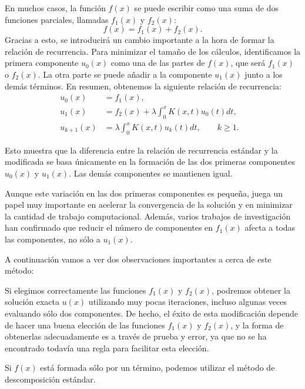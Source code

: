 En muchos casos, la función $f(x)$ se puede escribir como una suma de dos funciones parciales, llamadas $f_1(x)$ y $f_2(x)$:
\begin{equation}
	f(x) = f_1(x) + f_2(x).
\end{equation}
Gracias a esto, se introducirá un cambio importante a la hora de formar la relación de recurrencia. Para minimizar el tamaño de los cálculos, identificamos la primera componente $u_0(x)$ como una de las partes de $f(x)$, que será $f_1(x)$ o $f_2(x)$. La otra parte se puede añadir a la componente $u_1(x)$ junto a los demás términos. En resumen, obtenemos la siguiente relación de recurrencia:
\begin{align}
	u_0(x) &= f_1(x),      &   \\
	u_{1}(x) &= f_2(x) + \lambda \int_{0}^{x} K(x,t)u_0(t)dt,    &  \\
	u_{k+1}(x) &= \lambda \int_{0}^{x} K(x,t)u_k(t)dt, \qquad k \geqslant 1.    &
\end{align}	
\begin{observacion}
	Esto muestra que la diferencia entre la relación de recurrencia estándar y la modificada se basa únicamente en la formación de las dos primeras componentes $u_0(x)$ y $u_1(x)$. Las demás componentes se mantienen igual.
\end{observacion}
Aunque este variación en las dos primeras componentes es pequeña, juega un papel muy importante en acelerar la convergencia de la solución y en minimizar la cantidad de trabajo computacional. Además, varios trabajos de investigación han confirmado que reducir el número de componentes en $f_1(x)$ afecta a todas las componentes, no sólo a $u_1(x)$.

A continuación vamos a ver dos observaciones importantes a cerca de este método:
\begin{observacion}
	Si elegimos correctamente las funciones $f_1(x)$ y $f_2(x)$, podremos obtener la solución exacta $u(x)$ utilizando muy pocas iteraciones, incluso algunas veces evaluando sólo dos componentes. De hecho, el éxito de esta modificación depende de hacer una buena elección de las funciones $f_1(x)$ y $f_2(x)$, y la forma de obtenerlas adecuadamente es a través de prueba y error, ya que no se ha encontrado todavía una regla para facilitar esta elección.
\end{observacion}

\begin{observacion}
	Si $f(x)$ está formada sólo por un término, podemos utilizar el método de descomposición estándar.
\end{observacion}


